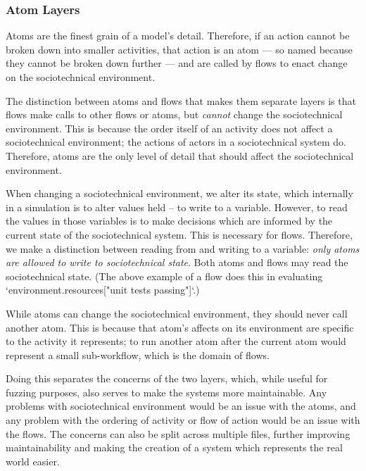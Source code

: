 \subsubsection{Atom Layers}
Atoms are the finest grain of a model's detail. Therefore, if an action cannot be broken down into smaller activities, that action is an atom --- so named because they cannot be broken down further --- and are called by flows to enact change on the sociotechnical environment. \par
The distinction between atoms and flows that makes them separate layers is that flows make calls to other flows or atoms, but \emph{cannot} change the sociotechnical environment. This is because the order itself of an activity does not affect a sociotechnical environment; the actions of actors in a sociotechnical system do. Therefore, atoms are the only level of detail that should affect the sociotechnical environment. \par
When changing a sociotechnical environment, we alter its state, which internally in a simulation is to alter values held -- to write to a variable. However, to read the values in those variables is to make decisions which are informed by the current state of the sociotechnical system. This is necessary for flows. Therefore, we make a distinction between reading from and writing to a variable: \emph{only atoms are allowed to write to sociotechnical state}. Both atoms and flows may read the sociotechnical state. (The above example of a flow does this in evaluating `environment.resources["unit tests passing"]`.)\par
While atoms can change the sociotechnical environment, they should never call another atom. This is because that atom's affects on its environment are specific to the activity it represents; to run another atom after the current atom would represent a small sub-workflow, which is the domain of flows. \par
Doing this separates the concerns of the two layers, which, while useful for fuzzing purposes, also serves to make the systems more maintainable. Any problems with sociotechnical environment would be an issue with the atoms, and any problem with the ordering of activity or flow of action would be an issue with the flows. The concerns can also be split across multiple files, further improving maintainability and making the creation of a system which represents the real world easier. \par
